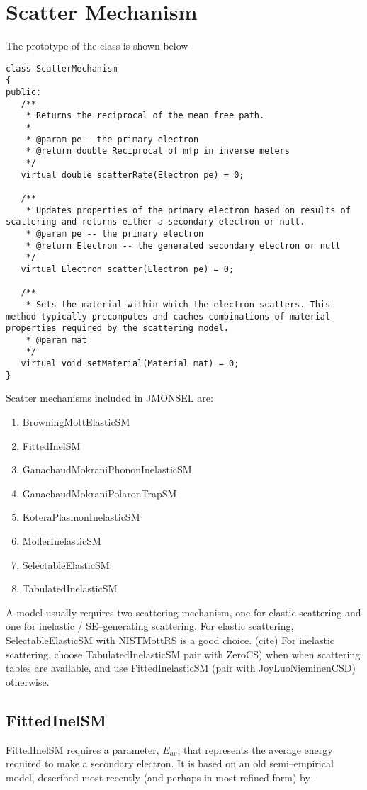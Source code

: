 \section{Scatter Mechanism}\label{impl:sm}
The prototype of the class is shown below
\begin{lstlisting}
class ScatterMechanism
{
public:
   /**
    * Returns the reciprocal of the mean free path.
    *
    * @param pe - the primary electron
    * @return double Reciprocal of mfp in inverse meters
    */
   virtual double scatterRate(Electron pe) = 0;

   /**
    * Updates properties of the primary electron based on results of scattering and returns either a secondary electron or null.
    * @param pe -- the primary electron
    * @return Electron -- the generated secondary electron or null
    */
   virtual Electron scatter(Electron pe) = 0;

   /**
    * Sets the material within which the electron scatters. This method typically precomputes and caches combinations of material properties required by the scattering model.
    * @param mat
    */
   virtual void setMaterial(Material mat) = 0;
}
\end{lstlisting}

Scatter mechanisms included in JMONSEL are:
\begin{enumerate}
\item BrowningMottElasticSM
\item FittedInelSM
\item GanachaudMokraniPhononInelasticSM
\item GanachaudMokraniPolaronTrapSM
\item KoteraPlasmonInelasticSM
\item MollerInelasticSM
\item SelectableElasticSM
\item TabulatedInelasticSM
\end{enumerate}

A model usually requires two scattering mechanism, one for elastic scattering and one for inelastic / SE--generating scattering. For elastic scattering, SelectableElasticSM with NISTMottRS is a good choice. (cite) For inelastic scattering, choose TabulatedInelasticSM pair with ZeroCS) when when scattering tables are available, and use FittedInelasticSM (pair with JoyLuoNieminenCSD) otherwise.

\subsection{FittedInelSM}
FittedInelSM requires a parameter, $E_{av}$, that represents the average energy required to make a secondary electron. It is based on an old semi--empirical model, described most recently (and perhaps in most refined form) by \cite{lin2005new}.

